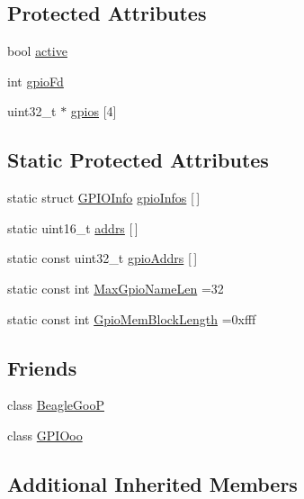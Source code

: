 \subsection*{Protected Attributes}
\begin{DoxyCompactItemize}
\item 
bool \hyperlink{struct_beagle_goo_a64e92bad467b29cb868bec64d1f6be6f}{active}
\item 
int \hyperlink{struct_beagle_goo_a1d4a232a0dbb10d38249e239c7e04788}{gpio\-Fd}
\item 
uint32\-\_\-t $\ast$ \hyperlink{struct_beagle_goo_aaa05aec2adfcadae3912e861ae35d50b}{gpios} \mbox{[}4\mbox{]}
\end{DoxyCompactItemize}
\subsection*{Static Protected Attributes}
\begin{DoxyCompactItemize}
\item 
static struct \hyperlink{struct_beagle_goo_1_1_g_p_i_o_info}{G\-P\-I\-O\-Info} \hyperlink{struct_beagle_goo_a2856c2fe9e24825ffd5691ab9a53d1f8}{gpio\-Infos} \mbox{[}$\,$\mbox{]}
\item 
static uint16\-\_\-t \hyperlink{struct_beagle_goo_a13b31f0a40c07bd0ca8c9d9fa51ae60a}{addrs} \mbox{[}$\,$\mbox{]}
\item 
static const uint32\-\_\-t \hyperlink{struct_beagle_goo_a709c4761b20d2db44096036573d3285f}{gpio\-Addrs} \mbox{[}$\,$\mbox{]}
\item 
static const int \hyperlink{struct_beagle_goo_ae4b9d09b2bfaf386c5d6fb9fdee0d4fa}{Max\-Gpio\-Name\-Len} =32
\item 
static const int \hyperlink{struct_beagle_goo_a0d7150aa275f183b3c552ab89584f272}{Gpio\-Mem\-Block\-Length} =0xfff
\end{DoxyCompactItemize}
\subsection*{Friends}
\begin{DoxyCompactItemize}
\item 
class \hyperlink{struct_beagle_goo_a3c53b8008fd7b4a4dc43d5c025cfb91f}{Beagle\-Goo\-P}
\item 
class \hyperlink{struct_beagle_goo_ad655c01bbbf0f8f066500cb0ea296455}{G\-P\-I\-Ooo}
\end{DoxyCompactItemize}
\subsection*{Additional Inherited Members}



